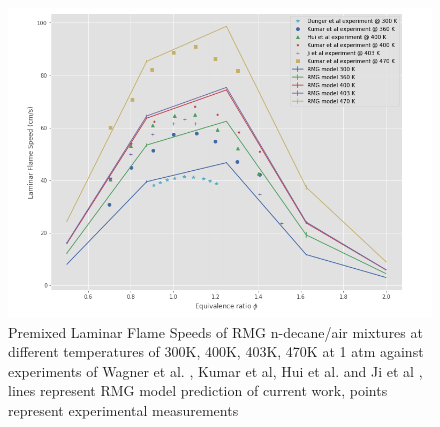 \begin{figure}[!hbp]
\begin{small}
\hspace*{-2.5cm}
    \centering
    \includegraphics[scale=0.45, keepaspectratio]{images/nc10_flamespeeds.png}
    \caption{Premixed Laminar Flame Speeds of RMG n-decane/air mixtures at different temperatures of 300K, 400K, 403K, 470K at 1 atm against experiments of Wagner et al. \cite{Wagner1955FlameVelocity}, Kumar et al\cite{KUMAR2007209}, Hui et al. \cite{Hui2013LaminarPressures} and Ji et al \cite{Ji2010PropagationFlames}, lines represent RMG model prediction of current work, points represent experimental measurements}
    \label{fig:nc10_flamespeed}
    \end{small}
\end{figure}








